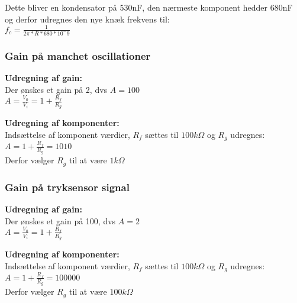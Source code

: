 Dette bliver en kondensator på 530nF, den nærmeste komponent hedder 680nF og derfor udregnes den nye knæk frekvens til:  \\
$ f_c = \frac{1}{2\pi * R * 680 * 10^-9} $

\subsubsection{Gain på manchet oscillationer }
\textbf{Udregning af gain: } \\
Der ønskes et gain på 2, dvs $A = 100$ \\
$ A = \frac{V_0}{V_i} = 1 + \frac{R_f}{R_g}$

\textbf{Udregning af komponenter:}\\
Indsættelse af komponent værdier, $R_f$ sættes til $100k\Omega$ og $R_g$ udregnes: \\
$ A = 1 + \frac{R_f}{R_g} = 1010$ \\
Derfor vælger $R_g$ til at være $1k\Omega$

\subsubsection{Gain på tryksensor signal }
\textbf{Udregning af gain: } \\
Der ønskes et gain på 100, dvs $A = 2$ \\
$ A = \frac{V_0}{V_i} = 1 + \frac{R_f}{R_g}$

\textbf{Udregning af komponenter:}\\
Indsættelse af komponent værdier, $R_f$ sættes til $100k\Omega$ og $R_g$ udregnes: \\
$ A = 1 + \frac{R_f}{R_g} = 100000$ \\
Derfor vælger $R_g$ til at være $100k\Omega$